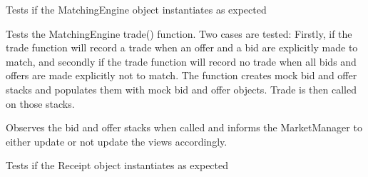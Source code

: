 \begin{DoxyRefList}
\item[\label{todo__todo000005}%
\hypertarget{todo__todo000005}{}%
Member \hyperlink{class_matching_engine_unit_test_acbb8d543a15e349d8f46769388fd28bd}{Matching\+Engine\+Unit\+Test.instantiation} ()]Tests if the Matching\+Engine object instantiates as expected  
\item[\label{todo__todo000006}%
\hypertarget{todo__todo000006}{}%
Member \hyperlink{class_matching_engine_unit_test_a2dbbdf5632bac8d35d6902caf5556c5f}{Matching\+Engine\+Unit\+Test.trade\+Test} ()]Tests the Matching\+Engine trade() function. Two cases are tested\+: Firstly, if the trade function will record a trade when an offer and a bid are explicitly made to match, and secondly if the trade function will record no trade when all bids and offers are made explicitly not to match. The function creates mock bid and offer stacks and populates them with mock bid and offer objects. Trade is then called on those stacks.  
\item[\label{todo__todo000007}%
\hypertarget{todo__todo000007}{}%
Member \hyperlink{class_matching_engine_unit_test_a914f15f54087d84798e02b33734a9791}{Matching\+Engine\+Unit\+Test.update\+Test} ()]Observes the bid and offer stacks when called and informs the Market\+Manager to either update or not update the views accordingly.  
\item[\label{todo__todo000008}%
\hypertarget{todo__todo000008}{}%
Member \hyperlink{class_receipt_unit_test_aab92fcc0a866db8ec56ed65b9693cdc8}{Receipt\+Unit\+Test.instantiation} ()]Tests if the Receipt object instantiates as expected 
\end{DoxyRefList}